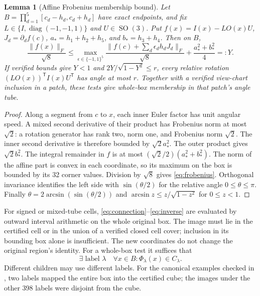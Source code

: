 \documentclass[11pt]{amsart}
\newcommand{\SO}{\operatorname{SO}}
\newcommand{\diag}{\operatorname{diag}}
\newcommand{\norm}[1]{\lVert#1\rVert}
\newtheorem{lemma}[theorem]{Lemma}
\theoremstyle{definition}
\theoremstyle{remark}
\begin{document}
\begin{lemma}[Affine Frobenius membership bound]\label{lem:membership}
Let $B=\prod_{d=1}^5[c_d-h_d,c_d+h_d]$ have exact endpoints, and fix
$L\in\{I,\diag(-1,-1,1)\}$ and $U\in\SO(3)$.
Put $f(x)=I(x)-LO(x)U$, $J_d=\partial_df(c)$,
$a_*=h_1+h_2+h_5$, and $b_*=h_3+h_4$. Then on $B$,
\begin{equation}\label{eq:frobenius}
 \frac{\norm{f(x)}_F}{\sqrt8}\le
 \max_{\epsilon\in\{-1,1\}^5}
 \frac{\norm{f(c)+\sum_d\epsilon_dh_dJ_d}_F}{\sqrt8}
                   +\frac{a_*^2+b_*^2}{4}=:Y.
\end{equation}
If verified bounds give $Y<1$ and
$2Y/\sqrt{1-Y^2}\le r$, every relative rotation
$(LO(x))^{\mathsf T}I(x)U^{\mathsf T}$ has angle at most $r$.
Together with a verified view-chart inclusion in a patch, these tests
give whole-box membership in that patch's angle tube.
\end{lemma}
\begin{proof}
Along a segment from $c$ to $x$, each inner Euler factor has unit angular
speed. A mixed second derivative of their product has Frobenius norm at
most $\sqrt2$: a rotation generator has rank two, norm one, and
Frobenius norm $\sqrt2$. The inner second derivative is therefore bounded
by $\sqrt2a_*^2$. The outer product gives $\sqrt2b_*^2$. The integral
remainder in $f$ is at most $(\sqrt2/2)(a_*^2+b_*^2)$.
The norm of the affine part is convex in each coordinate, so its maximum
on the box is bounded by its 32 corner values. Division by $\sqrt8$
gives \eqref{eq:frobenius}. Orthogonal invariance identifies the left
side with $\sin(\theta/2)$ for the relative angle $0\le\theta\le\pi$.
Finally $\theta=2\arcsin(\sin(\theta/2))$ and
$\arcsin z\le z/\sqrt{1-z^2}$ for $0\le z<1$.
\end{proof}

For signed or mixed-tube cells, \eqref{eq:connection}--\eqref{eq:inverse}
are evaluated by outward interval arithmetic on the whole original box.
The image must lie in the certified cell or in the union of a verified
closed cell cover; inclusion in its bounding box alone is insufficient.
The new coordinates do not change the original region's identity.
For a whole-box test it suffices that
\[
 \exists\text{ label }\lambda\quad\forall x\in B:
                   \Phi_\lambda(x)\in C_\lambda.
\]
Different children may use different labels. For the canonical examples
checked in \cite{review}, two labels mapped the entire box into the
certified cube; the images under the other 398 labels were disjoint
from the cube.
\end{document}

